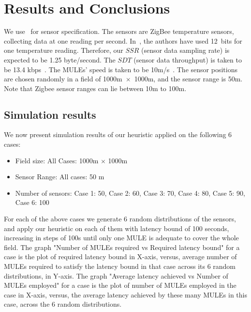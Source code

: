 \chapter{Results and Conclusions}\label{chapter:5}


We use~\cite{terada} for sensor specification. The sensors are ZigBee temperature sensors, collecting data at one reading per second. In~\cite{terada}, the authors have used 12~bits for one temperature reading. Therefore, our $SSR$ (sensor data sampling rate) is expected to be 1.25 byte/second. The $SDT$ (sensor data throughput) is taken to be 13.4 kbps~\cite{zigbee}. The MULEs' speed is taken to be 10m/s~\cite{muleSpeed}. The sensor positions are chosen randomly in a field of 1000m~$\times$~1000m, and the sensor range is 50m. Note that Zigbee sensor ranges can lie between 10m to 100m.

\section{Simulation results}
\label{sec:sim}
We now present simulation results of our heuristic applied on the following 6 cases:
\begin{itemize}
\item Field size: All Cases: 1000m $\times$ 1000m
\item Sensor Range: All cases: 50 m
\item Number of sensors: Case 1: 50, Case 2: 60, Case 3: 70, Case 4: 80, Case 5: 90, Case 6: 100
\end{itemize}

For each of the above cases we generate 6 random distributions of the sensors, and apply our heuristic on each of them with latency bound of 100 seconds, increasing in steps of 100s until only one MULE is adequate to cover the whole field. The graph "Number of MULEs required vs Required latency bound" for a case is the plot of required latency bound in X-axis, versus, average number of MULEs required to satisfy the latency bound in that case across its 6 random distributions, in Y-axis. The graph "Average latency achieved vs Number of MULEs employed" for a case is the plot of number of MULEs employed in the case in X-axis, versus, the average latency achieved by these many MULEs in this case, across the 6 random distributions.

